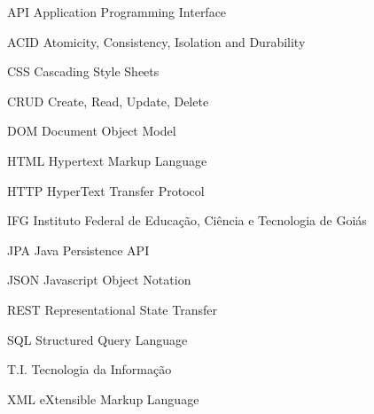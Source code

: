 \begin{siglas}
  \item [API] Application Programming Interface
  \item [ACID] Atomicity, Consistency, Isolation and Durability
  \item [CSS] Cascading Style Sheets
  \item [CRUD] Create, Read, Update, Delete
  \item [DOM] Document Object Model
  \item [HTML] Hypertext Markup Language
  \item [HTTP] HyperText Transfer Protocol
  \item [IFG] Instituto Federal de Educação, Ciência e Tecnologia de Goiás 
  \item [JPA] Java Persistence API
  \item [JSON] Javascript Object Notation
  \item [REST] Representational State Transfer
  \item [SQL] Structured Query Language
  \item [T.I.] Tecnologia da Informação
  \item [XML] eXtensible Markup Language
\end{siglas}
